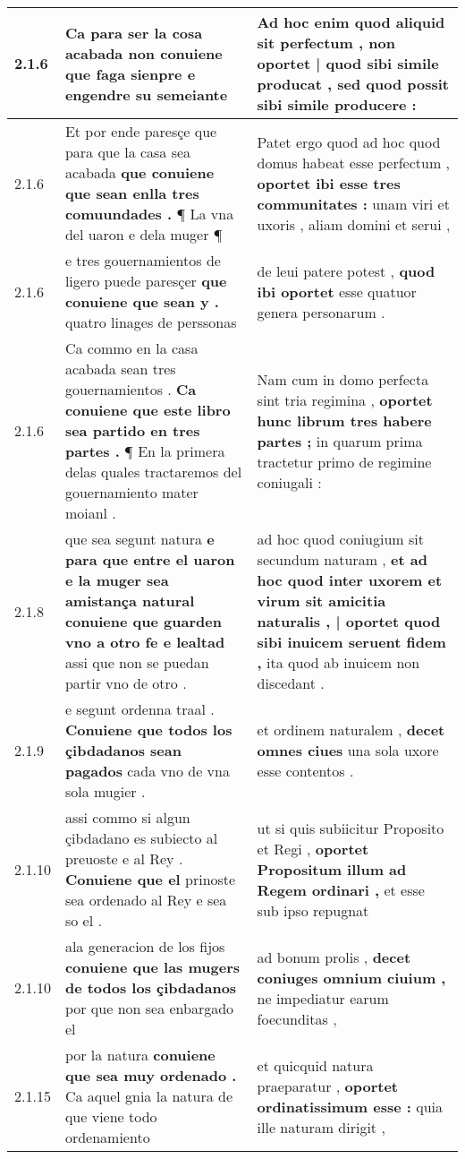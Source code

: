 \begin{tabular}{|p{1cm}|p{6.5cm}|p{6.5cm}|}
2.1.6 & Ca para ser la cosa acabada \textbf{ non conuiene que faga sienpre } e engendre su semeiante & Ad hoc enim quod aliquid sit perfectum , \textbf{ non oportet | quod sibi simile producat , } sed quod possit sibi simile producere : \\\hline
2.1.6 & Et por ende paresçe que para que la casa sea acabada \textbf{ que conuiene que sean enlla tres comuundades . } ¶ La vna del uaron e dela muger ¶ & Patet ergo quod ad hoc quod domus habeat esse perfectum , \textbf{ oportet ibi esse tres communitates : } unam viri et uxoris , aliam domini et serui , \\\hline
2.1.6 & e tres gouernamientos de ligero puede paresçer \textbf{ que conuiene que sean y . } quatro linages de perssonas & de leui patere potest , \textbf{ quod ibi oportet } esse quatuor genera personarum . \\\hline
2.1.6 & Ca commo en la casa acabada sean tres gouernamientos . \textbf{ Ca conuiene que este libro sea partido en tres partes . } ¶ En la primera delas quales tractaremos del gouernamiento mater moianl . & Nam cum in domo perfecta sint tria regimina , \textbf{ oportet hunc librum tres habere partes ; } in quarum prima tractetur primo de regimine coniugali : \\\hline
2.1.8 & que sea segunt natura \textbf{ e para que entre el uaron e la muger sea amistança natural conuiene que guarden vno a otro fe e lealtad } assi que non se puedan partir vno de otro . & ad hoc quod coniugium sit secundum naturam , \textbf{ et ad hoc quod inter uxorem et virum sit amicitia naturalis , | oportet quod sibi inuicem seruent fidem , } ita quod ab inuicem non discedant . \\\hline
2.1.9 & e segunt ordenna traal . \textbf{ Conuiene que todos los çibdadanos sean pagados } cada vno de vna sola mugier . & et ordinem naturalem , \textbf{ decet omnes ciues } una sola uxore esse contentos . \\\hline
2.1.10 & assi commo si algun çibdadano es subiecto al preuoste e al Rey . \textbf{ Conuiene que el } prinoste sea ordenado al Rey e sea so el . & ut si quis subiicitur Proposito et Regi , \textbf{ oportet Propositum illum ad Regem ordinari , } et esse sub ipso repugnat \\\hline
2.1.10 & ala generacion de los fijos \textbf{ conuiene que las mugers de todos los çibdadanos } por que non sea enbargado el & ad bonum prolis , \textbf{ decet coniuges omnium ciuium , } ne impediatur earum foecunditas , \\\hline
2.1.15 & por la natura \textbf{ conuiene que sea muy ordenado . } Ca aquel gnia la natura de que viene todo ordenamiento & et quicquid natura praeparatur , \textbf{ oportet ordinatissimum esse : } quia ille naturam dirigit , \\\hline

\end{tabular}
